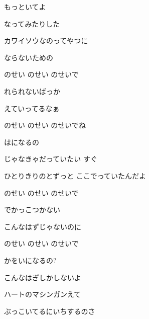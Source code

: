 \documentclass[14pt]{ltjsarticle}
\begin{document}
{  もっといてよ
  \jisho{}

\item
  なってみたりした
  \jisho{}

  カワイソウなのってやつに
  \jisho{}

  ならないための
  \jisho{}

\item
  のせい のせい のせいで
  \jisho{}

  れられないばっか
  \jisho{}

  えていってるなぁ
  \jisho{}

  のせい のせい のせいでね
  \jisho{}

  はになるの
  \jisho{}

\item
  じゃなきゃだっていたい すぐ
  \jisho{}

  ひとりきりのとずっと ここでっていたんだよ
  \jisho{}

\item
  のせい のせい のせいで
  \jisho{}

  でかっこつかない
  \jisho{}

  こんなはずじゃないのに
  \jisho{}

  のせい のせい のせいで
  \jisho{}

  かをいになるの?
  \jisho{}

  こんなはぎしかしないよ
  \jisho{}

  ハートのマシンガンえて
  \jisho{}

  ぶっこいてるにいちするのさ
  \jisho{}

}
\end{document}
